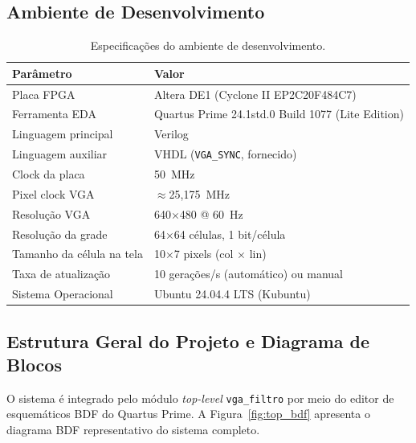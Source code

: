 \documentclass[12pt, a4paper]{article}
\begin{document}
	\subsection{Ambiente de Desenvolvimento}
	
	\begin{table}[H]
		\centering
		\caption{Especificações do ambiente de desenvolvimento.}
		\label{tab:ambiente}
		\begin{tabular}{ll}
			\toprule
			\textbf{Parâmetro}        & \textbf{Valor}                                     \\
			\midrule
			Placa FPGA                & Altera DE1 (Cyclone II EP2C20F484C7)               \\
			Ferramenta EDA            & Quartus Prime 24.1std.0 Build 1077 (Lite Edition)  \\
			Linguagem principal       & Verilog                                            \\
			Linguagem auxiliar        & VHDL (\texttt{VGA\_SYNC}, fornecido)               \\
			Clock da placa            & 50~MHz                                             \\
			Pixel clock VGA           & $\approx$25,175~MHz                                \\
			Resolução VGA             & 640$\times$480 @ 60~Hz                             \\
			Resolução da grade        & 64$\times$64 células, 1 bit/célula                 \\
			Tamanho da célula na tela & 10$\times$7 pixels (col $\times$ lin)              \\
			Taxa de atualização       & 10 gerações/s (automático) ou manual               \\
			Sistema Operacional       & Ubuntu 24.04.4 LTS (Kubuntu)                       \\
			\bottomrule
		\end{tabular}
	\end{table}
	
	\subsection{Estrutura Geral do Projeto e Diagrama de Blocos}
	
	O sistema é integrado pelo módulo \textit{top-level} \texttt{vga\_filtro} por
	meio do editor de esquemáticos BDF do Quartus Prime. A Figura~\ref{fig:top_bdf}
	apresenta o diagrama BDF representativo do sistema completo.
	
\end{document}
